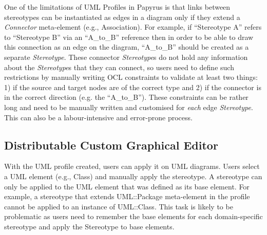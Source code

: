 One of the limitations of UML Profiles in Papyrus is that links between stereotypes can be instantiated as edges in a diagram only if they extend a \textit{Connector} meta-element (e.g., Association).  
For example, if ``Stereotype A'' refers to ``Stereotype B'' via an ``A\_to\_B'' reference then in order to be able to draw this connection as an edge on the diagram, ``A\_to\_B'' should be created as a separate \textit{Stereotype}. 
These connector \textit{Stereotype}s do not hold any information about the \textit{Stereotype}s that they can connect, so users need to define such restrictions by manually writing OCL constraints to validate at least two things: 1) if the source and target nodes are of the correct type and 2) if the connector is in the correct direction (e.g. the ``A\_to\_B''). 
These constraints can be rather long and need to be manually written and customised for \textit{each} edge \textit{Stereotype}. This can also be a labour-intensive and error-prone process.

\subsection{Distributable Custom Graphical Editor}
With the UML profile created, users can apply it on UML diagrams. 
Users select a UML element (e.g., Class) and manually apply the stereotype. 
A stereotype can only be applied to the UML element that was defined as its base element. 
For example, a stereotype that extends UML::Package meta-element in the profile cannot be applied to an instance of UML::Class. 
This task is likely to be problematic as users need to remember the base elements for each domain-specific stereotype and apply the Stereotype to base elements. 


